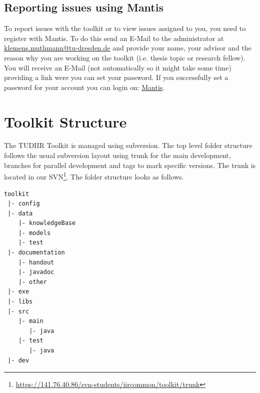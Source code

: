 \documentclass[a4paper,twoside]{book}      %
\begin{document}
\section{Reporting issues using Mantis}
To report issues with the toolkit or to view issues assigned to you, you need to register with Mantis. To do this send an E-Mail to the administrator at \href{mailto:klemens.muthmann@tu-dresden.de}{klemens.muthmann@tu-dresden.de} and provide your name, your advisor and the reason why you are working on the toolkit (i.e. thesis topic or research fellow). You will receive an E-Mail (not automatically so it might take some time) providing a link were you can set your password. If you successfully set a password for your account you can login on: \href{http://141.76.40.242/mantisbt}{Mantis}.

\chapter{Toolkit Structure}
\label{sec:toolkitstructure}
The TUDIIR Toolkit is managed using subversion. The top level folder structure follows the usual subversion layout using trunk for the main development, branches for parallel development and tags to mark specific versions. The trunk is located in our SVN\footnote{\url{https://141.76.40.86/svn-students/iircommon/toolkit/trunk}}. The folder structure looks as follows.
\begin{verbatim}
toolkit
 |- config
 |- data
    |- knowledgeBase
    |- models
    |- test
 |- documentation
    |- handout
    |- javadoc
    |- other
 |- exe
 |- libs
 |- src
    |- main
       |- java
    |- test
       |- java
 |- dev
\end{verbatim}
\end{document}
